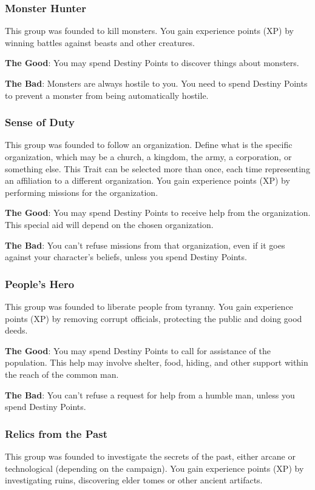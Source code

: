 \begin{multicols}{2}
\subsubsection{Monster Hunter}
This group was founded to kill monsters.
You gain experience points (XP) by winning battles
against beasts and other creatures.

\textbf{The Good}: You may spend Destiny Points
to discover things about monsters.

\textbf{The Bad}: Monsters are always hostile to
you. You need to spend Destiny Points to prevent a
monster from being automatically hostile.

\subsubsection{Sense of Duty}
This group was founded to follow an
organization. Define what is the specific
organization, which may be a church, a kingdom,
the army, a corporation, or something else. This
Trait can be selected more than once, each time
representing an affiliation to a different
organization. You gain experience points (XP) by
performing missions for the organization.

\textbf{The Good}: You may spend Destiny Points
to receive help from the organization. This special
aid will depend on the chosen organization.

\textbf{The Bad}: You can’t refuse missions from
that organization, even if it goes against your
character’s beliefs, unless you spend Destiny
Points.

\subsubsection{People’s Hero}
This group was founded to liberate people
from tyranny. You gain experience points (XP) by
removing corrupt officials, protecting the public
and doing good deeds.

\textbf{The Good}: You may spend Destiny Points
to call for assistance of the population. This help
may involve shelter, food, hiding, and other
support within the reach of the common man.

\textbf{The Bad}: You can’t refuse a request for
help from a humble man, unless you spend Destiny
Points.

\subsubsection{Relics from the Past}
This group was founded to investigate the
secrets of the past, either arcane or technological
(depending on the campaign). You gain experience
points (XP) by investigating ruins, discovering
elder tomes or other ancient artifacts.


\end{multicols}
